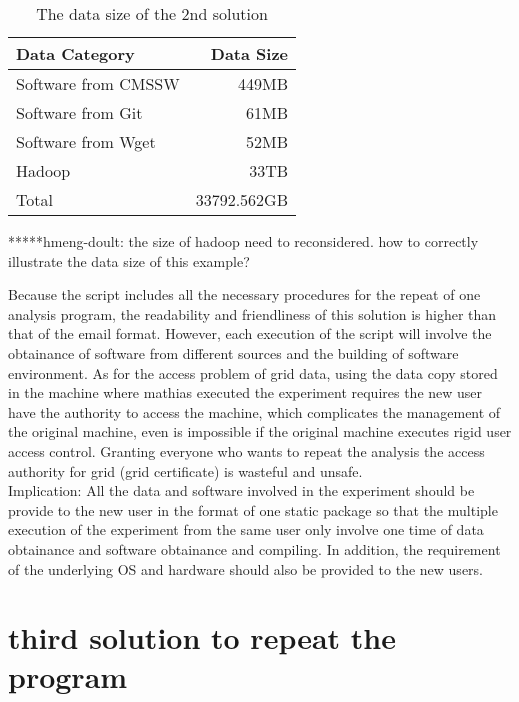 \documentclass{article}
\begin{document}
\begin{table}
    \centering
    \begin{tabular}{|l|r|}
    \hline
    Data Category & Data Size \\ \hline
    Software from CMSSW & 449MB \\ \hline
    Software from Git & 61MB \\ \hline
    Software from Wget & 52MB \\ \hline
    Hadoop & 33TB \\ \hline
    Total & 33792.562GB \\ \hline
    \end{tabular}
    \caption{The data size of the 2nd solution}
    \label{table:datasize-2nd}
\end{table}
*****hmeng-doult: the size of hadoop need to reconsidered. how to correctly illustrate the data size of this example?

Because the script includes all the necessary procedures for the repeat of one analysis program, the readability and friendliness of this solution is higher than that of the email format. However, each execution of the script will involve the obtainance of software from different sources and the building of software environment. As for the access problem of grid data, using the data copy stored in the machine where mathias executed the experiment requires the new user have the authority to access the machine, which complicates the management of the original machine, even is impossible if the original machine executes rigid user access control. Granting everyone who wants to repeat the analysis the access authority for grid (grid certificate) is wasteful and unsafe. \\

Implication: All the data and software involved in the experiment should be provide to the new user in the format of one static package so that the multiple execution of the experiment from the same user only involve one time of data obtainance and software obtainance and compiling. In addition, the requirement of the underlying OS and hardware should also be provided to the new users.

\section{third solution to repeat the program}
\end{document}
